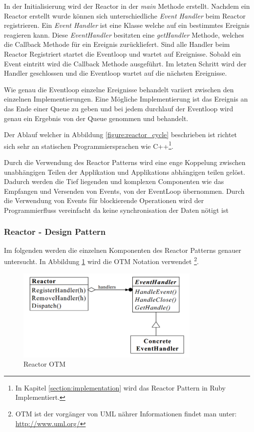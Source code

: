 In der Initialisierung wird der Reactor in der \emph{main} Methode erstellt. Nachdem ein Reactor erstellt wurde können sich unterschiedliche \emph{Event Handler} beim Reactor registrieren. Ein \emph{Event Handler} ist eine Klasse welche auf ein bestimmtes Ereignis reagieren kann. Diese \emph{EventHandler} besitzten eine \emph{getHandler} Methode, welches die Callback Methode für ein Ereignis zurückliefert. Sind alle Handler beim Reactor Registriert startet die Eventloop und wartet auf Ereignisse. Sobald ein Event eintritt wird die Callback Methode ausgeführt. Im letzten Schritt wird der Handler geschlossen und die Eventloop wartet auf die nächsten Ereignisse. 

Wie genau die Eventloop einzelne Ereignisse behandelt variiert zwischen den einzelnen Implementierungen. Eine Mögliche Implementierung ist das Ereignis an das Ende einer Queue zu geben und bei jedem durchlauf der Eventloop wird genau ein Ergebnis von der Queue genommen und behandelt.

Der Ablauf welcher in Abbildung \ref{figure:reactor_cycle} beschrieben ist richtet sich sehr an statischen Programmiersprachen wie C++\footnote{In Kapitel \ref{section:implementation} wird das Reactor Pattern in Ruby Implementiert.}.

Durch die Verwendung des Reactor Patterns wird eine enge Koppelung zwischen unabhängigen Teilen der Applikation und Applikations abhängigen teilen gelöst. Dadurch werden die Tief liegenden und komplexen Componenten wie das Empfangen und Versenden von Events, von der EventLoop übernommen. Durch die Verwendung von Events für blockierende Operationen wird der Programmierfluss vereinfacht da keine synchronisation der Daten nötigt ist \cite[p. 2]{Sch95}

\subsubsection{Reactor - Design Pattern}

Im folgenden werden die einzelnen Komponenten des Reactor Patterns genauer untersucht. In Abbildung \ref{figure:reactor_otm} wird die OTM Notation verwendet \footnote[0]{OTM ist der vorgänger von UML nährer Informationen findet man unter: \url{http://www.uml.org/}}.

\begin{figure}[!htb]
  \centering
  \includegraphics[width=9cm]{images/reactor_otm.png}
  \caption{
    Reactor OTM \cite[p. 4]{Sch95}
  }
  \label{figure:reactor_otm}
\end{figure}

